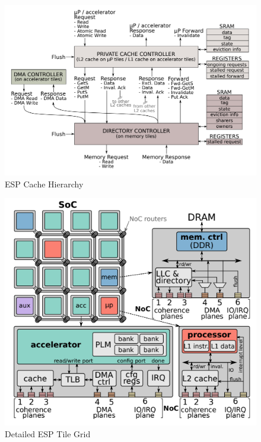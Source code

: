 \documentclass{sig-alternate}
\begin{document}
\begin{figure}[h]
  \centering
  \captionsetup{justification=centering, format=hang}
  \includegraphics[width=1\columnwidth]{fig/esp_hier.png}
  \caption{ESP Cache Hierarchy~\cite{giri18}}
  \label{fig:esp_hier}
  \end{figure}

\begin{figure}[h]
  \centering
  \captionsetup{justification=centering, format=hang}
  \includegraphics[width=1\columnwidth]{fig/noccache.png}
  \caption{Detailed ESP Tile Grid~\cite{giri18}}
  \label{fig:esp_tile}
  \end{figure}
  
\end{document}
